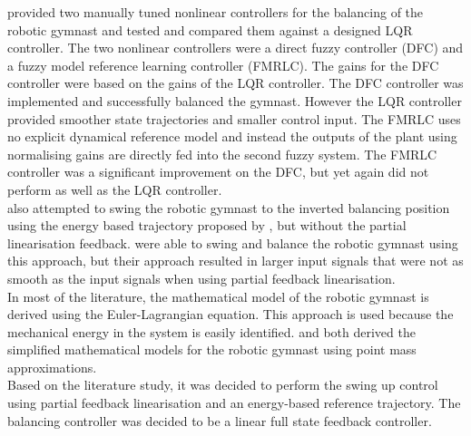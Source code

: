 \citet{Brown1997} provided two manually tuned nonlinear controllers for the balancing of the robotic gymnast and tested and compared them against a designed LQR controller. The two nonlinear controllers were a direct fuzzy controller (DFC) and a fuzzy model reference learning controller (FMRLC). The gains for the DFC controller were based on the gains of the LQR controller. The DFC controller was implemented and successfully balanced the gymnast. However the LQR controller provided smoother state trajectories and smaller control input. The FMRLC uses no explicit dynamical reference model and instead the outputs of the plant using normalising gains are directly fed into the second fuzzy system. The FMRLC controller was a significant improvement on the DFC, but yet again did not perform as well as the LQR controller.\\


\citeauthor{Brown1997} also attempted to swing the robotic gymnast to the inverted balancing position using the energy based trajectory proposed by \citeauthor{spong_swingup}, but without the partial linearisation feedback. \citeauthor{Brown1997} were able to swing and balance the robotic gymnast using this approach, but their approach resulted in larger input signals that were not as smooth as the input signals when using partial feedback linearisation.\\



In most of the literature, the mathematical model of the robotic gymnast is derived using the Euler-Lagrangian equation. This approach is used because the mechanical energy in the system is easily identified. \citet{derivation_controlPlaner} and \citet{tedrake} both derived the simplified mathematical models for the robotic gymnast using point mass approximations. \\

Based on the literature study, it was decided to perform the swing up control using partial feedback linearisation and an energy-based reference trajectory. The balancing controller was decided to be a linear full state feedback controller.


